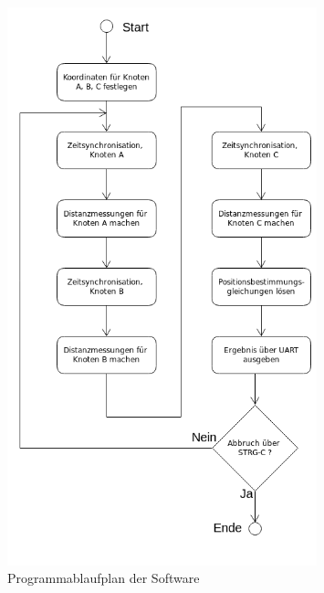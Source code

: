 \begin{figure}[H]
\centering
\includegraphics[width=0.8\textwidth]{images/PAP.png}
\caption{Programmablaufplan der Software}
\label{img:PAP}
\end{figure}




















